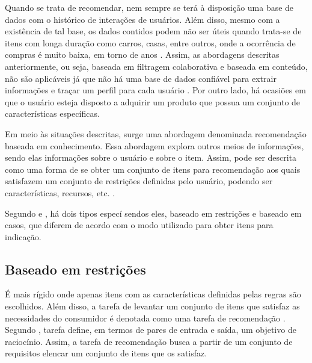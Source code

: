 Quando se trata de recomendar, nem sempre se terá à disposição uma base de dados com o histórico de interações de usuários. Além disso, mesmo com a existência de tal base,  os dados contidos podem não ser úteis quando trata-se de itens com longa duração como carros, casas, entre outros, onde a ocorrência de compras é muito baixa, em torno de anos \cite{Jannach2010}. Assim, as abordagens descritas anteriormente, ou seja, baseada em filtragem colaborativa e baseada em conteúdo, não são aplicáveis já que não há uma base de dados confiável para extrair informações e traçar um perfil para cada usuário  \cite{Ricci2010}. Por outro lado, há ocasiões em que o usuário esteja disposto a adquirir um produto que possua um conjunto de características específicas. 

Em meio às situações descritas, surge uma abordagem denominada recomendação baseada em conhecimento. Essa abordagem explora outros meios de informações, sendo elas informações sobre o usuário e sobre o item.
Assim, pode ser descrita como uma forma de se obter um conjunto de itens para recomendação aos quais satisfazem um conjunto de restrições definidas pelo usuário, podendo ser características, recursos, etc. \cite{Jannach2010}.

Segundo  e , há dois tipos especí sendos eles, baseado em restrições e baseado em casos, que diferem de acordo com o modo utilizado para obter itens para indicação.

\subsection{Baseado em restrições}
    É mais rígido onde apenas itens com as características definidas pelas regras são escolhidos. Além disso, a tarefa de levantar um conjunto de itens que satisfaz as necessidades do consumidor é denotada como uma tarefa de recomendação \cite{Ricci2010}. Segundo , tarefa define, em termos de pares de entrada e saída, um objetivo de raciocínio. Assim, a tarefa de recomendação busca a partir de um conjunto de requisitos elencar um conjunto de itens que os satisfaz.
    
    
